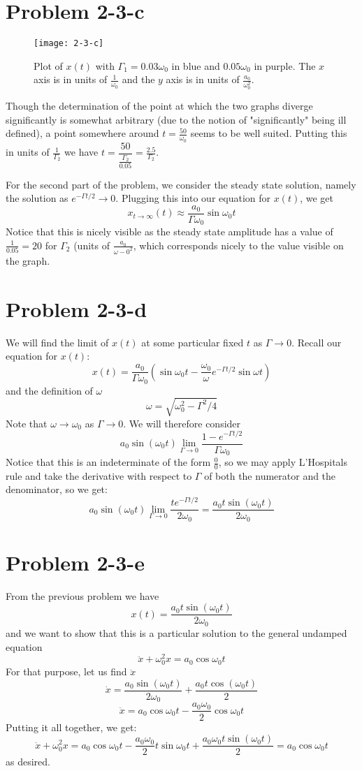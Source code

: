 \section*{Problem 2-3-c}
\begin{wrapfigure}{r}{0.5\textwidth}
\texttt{[image: 2-3-c]}
\label{fig:2-3-c}
\caption{Plot of $x(t)$ with $\Gamma_1 = 0.03\omega_0$ in blue and $0.05\omega_0$ in purple. The $x$ axis is in units of $\frac{1}{\omega_0}$ and the $y$ axis is in units of $\frac{a_0}{\omega_0^2}$.}
\vspace{40pt}
\end{wrapfigure}
Though the determination of the point at which the two graphs diverge significantly is somewhat arbitrary (due to the notion of "significantly" being ill defined), a point somewhere around $t=\frac{50}{\omega_0}$ seems to be well suited. Putting this in units of $\frac{1}{\Gamma_2}$ we have $t = \dfrac{50}{\frac{\Gamma_2}{0.05}}=\frac{2.5}{\Gamma_2}$.
\par
For the second part of the problem, we consider the steady state solution, namely the solution as $e^{-\Gamma t/2}\to 0$. Plugging this into our equation for $x(t)$, we get
\[ x_{t\to\infty}(t) \approx \frac{a_0}{\Gamma\omega_0}\sin \omega_0 t \]
Notice that this is nicely visible as the steady state amplitude has a value of $\frac{1}{0.05}=20$ for $\Gamma_2$ (units of $\frac{a_0}{\omega-0^2}$, which corresponds nicely to the value visible on the graph.
\section*{Problem 2-3-d}
We will find the limit of $x(t)$ at some particular fixed $t$ as $\Gamma\to 0$.
Recall our equation for $x(t)$:
\[ x(t)=\dfrac{a_0}{\Gamma \omega_0}\left(\sin \omega_0 t -\frac{\omega_0}{\omega}e^{-\Gamma t/2}\sin \omega t\right) \]
and the definition of $\omega$
\[ \omega = \sqrt{\omega_0^2-\Gamma^2/4} \]
Note that $\omega \to \omega_0$ as $\Gamma \to 0$. We will therefore consider
\[ a_0\sin(\omega_0t) \lim\limits_{\Gamma\to 0} \frac{1-e^{-\Gamma t/2}}{\Gamma\omega_0} \]
Notice that this is an indeterminate of the form $\frac{0}{0}$, so we may apply L'Hospitals rule and take the derivative with respect to $\Gamma$ of both the numerator and the denominator, so we get:
\[ a_0\sin(\omega_0 t) \lim\limits_{\Gamma\to 0} \frac{t e^{-\Gamma t/2}}{2\omega_0} = \frac{a_0 t \sin(\omega_0 t)}{2\omega_0} \]
\section*{Problem 2-3-e}
From the previous problem we have 
\[ x(t) = \frac{a_0 t \sin(\omega_0 t)}{2\omega_0} \]
and we want to show that this is a particular solution to the general undamped  equation
\[ \ddot{x} + \omega_0^2 x = a_0\cos \omega_0 t \]
For that purpose, let us find $\ddot{x}$
\[ \dot{x} = \dfrac{a_0 \sin(\omega_0 t)}{2\omega_0} + \dfrac{a_0 t \cos (\omega_0 t)}{2} \]
\[ \ddot{x} = a_0\cos\omega_0 t - \frac{a_0 \omega_0}{2}\cos \omega_0 t \]
Putting it all together, we get:
\[ \ddot{x} + \omega_0^2 x  = a_0\cos\omega_0 t - \frac{a_0 \omega_0}{2}t \sin \omega_0 t + \frac{a_0 \omega_0 t \sin(\omega_0 t)}{2} =  a_0\cos \omega_0 t  \] 
as desired.
